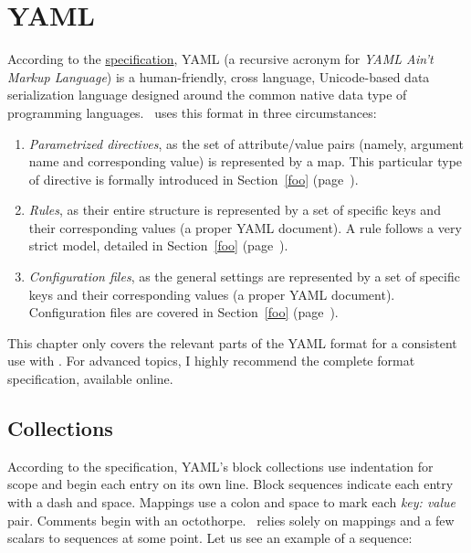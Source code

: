 \chapter{YAML}
\label{chap:yaml}

According to the \href{http://yaml.org/spec/1.2/spec.html}{specification}, YAML (a recursive acronym for \emph{YAML Ain't Markup Language}) is a human-friendly, cross language, Unicode-based data serialization language designed around the common native data type of programming languages. \arara\ uses this format in three circumstances:

\begin{enumerate}
\item\emph{Parametrized directives}, as the set of attribute/value pairs (namely, argument name and corresponding value) is represented by a map. This particular type of directive is formally introduced in Section~\ref{foo} (page~\pageref{foo}).

\item\emph{Rules}, as their entire structure is represented by a set of specific keys and their corresponding values (a proper YAML document). A rule follows a very strict model, detailed in Section~\ref{foo} (page~\pageref{foo}).

\item\emph{Configuration files}, as the general settings are represented by a set of specific keys and their corresponding values (a proper YAML document). Configuration files are covered in Section~\ref{foo} (page~\pageref{foo}).
\end{enumerate}

This chapter only covers the relevant parts of the YAML format for a consistent use with \arara. For advanced topics, I highly recommend the complete format specification, available online.

\section{Collections}
\label{sec:collections}

According to the specification, YAML's block collections use indentation for scope and begin each entry on its own line. Block sequences indicate each entry with a dash and space. Mappings use a colon and space to mark each \emph{key: value} pair. Comments begin with an octothorpe. \arara\ relies solely on mappings and a few scalars to sequences at some point. Let us see an example of a sequence:

